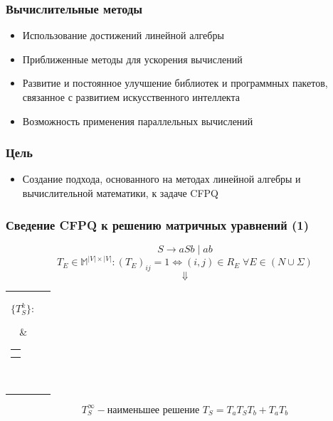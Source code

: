 \documentclass[xcolor=table]{beamer}
\begin{document}
\begin{frame}[fragile]
  \transwipe[direction=90]
  \frametitle{Вычислительные методы}
\begin{itemize}
  \item Использование достижений линейной алгебры
  \item Приближенные методы для ускорения вычислений
  \item Развитие и постоянное улучшение библиотек и программных пакетов, связанное с развитием искусственного интеллекта 
  \item Возможность применения параллельных вычислений
\end{itemize}
\end{frame}

\begin{frame}[fragile]
  \transwipe[direction=90]
  \frametitle{Цель}
\begin{itemize}
  \item Создание подхода, основанного на методах линейной алгебры и вычислительной математики, к задаче CFPQ
\end{itemize}



\end{frame}


\begin{frame}[fragile]
  \transwipe[direction=90]
  \frametitle{Сведение CFPQ к решению матричных уравнений (1)}
  
  $$S \rightarrow aSb \mid ab$$
  $$T_E \in \mathbb{M}^{|V| \times |V|}: (T_{E})_{ij} = 1 \iff (i,j) \in R_E \; \forall E \in (N \cup \Sigma)$$
  \pause
  $$\Downarrow$$
    \centering
    \begin{tabular}{cl}
    \parbox{0.07\linewidth}{
    $$\{ T_S^k \}:$$
    }
    & \begin{tabular}{l}
    $T_S^0 = \mathbf{0}$ \\
    $T_S^{k+1} = T_a T_S^k T_b + T_a T_b$
    \end{tabular} \\
    \end{tabular}

  $$T_S^{\infty} - \texttt{наименьшее решение } T_S = T_aT_ST_b + T_aT_b$$

\end{frame}
\end{document}
